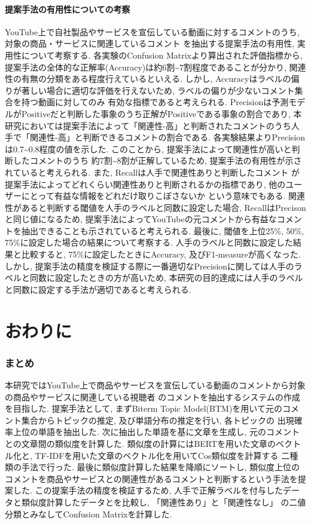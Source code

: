 \documentclass{ltjarticle}
\begin{document}
\subsection{提案手法の有用性についての考察}
YouTube上で自社製品やサービスを宣伝している動画に対するコメントのうち, 対象の商品・サービスに関連しているコメント
を抽出する提案手法の有用性, 実用性について考察する. 
各実験のConfusion Matrixより算出された評価指標から, 提案手法の全体的な正解率(Accuracy)は約6割\sim7割程度であることが分かり, 
関連性の有無の分類をある程度行えているといえる. 
しかし, Accuracyはラベルの偏りが著しい場合に適切な評価を行えないため, ラベルの偏りが少ないコメント集合を持つ動画に対してのみ
有効な指標であると考えられる. 
Precisionは予測モデルがPositiveだと判断した事象のうち正解がPositiveである事象の割合であり, 
本研究においては提案手法によって「関連性-高」と判断されたコメントのうち人手で「関連性-高」と判断できるコメントの割合である. 
各実験結果よりPrecisionは0.7\sim0.8程度の値を示した. このことから, 提案手法によって関連性が高いと判断したコメントのうち
約7割\sim8割が正解しているため, 提案手法の有用性が示されていると考えられる. また, Recallは人手で関連性ありと判断したコメント
が提案手法によってどれくらい関連性ありと判断されるかの指標であり, 他のユーザーにとって有益な情報をどれだけ取りこぼさないか
という意味でもある. 関連性があると判断する閾値を人手のラベルと同数に設定した場合, RecallはPrecisonと同じ値になるため, 
提案手法によってYouTubeの元コメントから有益なコメントを抽出できることも示されていると考えられる. 
最後に, 閾値を上位25\%, 50\%, 75\%に設定した場合の結果について考察する. 
人手のラベルと同数に設定した結果と比較すると, 75\%に設定したときにAccuracy, 及びF1-measureが高くなった. 
しかし, 提案手法の精度を検証する際に一番適切なPrecisionに関しては人手のラベルと同数に設定したときの方が高いため, 
本研究の目的達成には人手のラベルと同数に設定する手法が適切であると考えられる. 
\newpage
\part{おわりに}
\section{まとめ}
本研究ではYouTube上で商品やサービスを宣伝している動画のコメントから対象の商品やサービスに関連している視聴者
のコメントを抽出するシステムの作成を目指した. 
提案手法として, まずBiterm Topic Model(BTM)を用いて元のコメント集合からトピックの推定, 及び単語分布の推定を行い, 各トピックの
出現確率上位の単語を抽出した. 次に抽出した単語を基に文章を生成し, 元のコメントとの文章間の類似度を計算した. 
類似度の計算にはBERTを用いた文章のベクトル化と, TF-IDFを用いた文章のベクトル化を用いてCos類似度を計算する
二種類の手法で行った. 
最後に類似度計算した結果を降順にソートし, 類似度上位のコメントを商品やサービスとの関連性があるコメントと判断するという手法を提案した. 
この提案手法の精度を検証するため, 人手で正解ラベルを付与したデータと類似度計算したデータとを比較し, 「関連性あり」と「関連性なし」
の二値分類とみなしてConfusion Matrixを計算した. 
\end{document}
